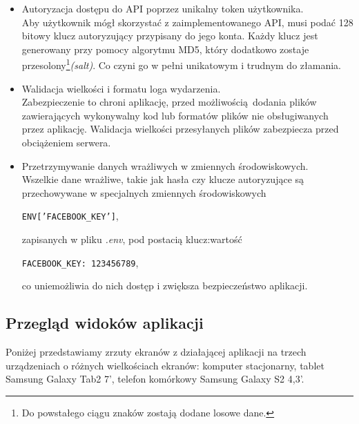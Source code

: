     \begin{itemize}
      \item Autoryzacja dostępu do API poprzez unikalny token użytkownika.\\
      Aby użytkownik mógł skorzystać z zaimplementowanego API, musi podać 128 bitowy klucz autoryzujący przypisany do jego konta. Każdy klucz jest generowany przy pomocy algorytmu MD5, który dodatkowo zostaje przesolony\footnote{Do powstałego ciągu znaków zostają dodane losowe dane.}\emph{(salt)}. Co czyni go w pełni unikatowym i trudnym do złamania.

      \item Walidacja wielkości i formatu loga wydarzenia.\\
      Zabezpieczenie to chroni aplikację, przed możliwością dodania plików zawierających wykonywalny kod lub formatów plików nie obsługiwanych przez aplikację. Walidacja wielkości przesyłanych plików zabezpiecza przed obciążeniem serwera.

      \item Przetrzymywanie danych wrażliwych w zmiennych środowiskowych.\\
      Wszelkie dane wrażliwe, takie jak hasła czy klucze autoryzujące są przechowywane w specjalnych zmiennych środowiskowych
      \begin{center}
        \texttt{ENV['FACEBOOK\_KEY']},
      \end{center}
      zapisanych w pliku \emph{.env}, pod postacią klucz:wartość
      \begin{center}
        \texttt{FACEBOOK\_KEY: 123456789},
      \end{center}
      co uniemożliwia do nich dostęp i zwiększa bezpieczeństwo aplikacji.
    \end{itemize}

    \clearpage
    \subsection{Przegląd widoków aplikacji}
    Poniżej przedstawiamy zrzuty ekranów z działającej aplikacji na trzech urządzeniach o różnych wielkościach ekranów: komputer stacjonarny, tablet Samsung Galaxy Tab2 7', telefon komórkowy Samsung Galaxy S2 4,3'.

